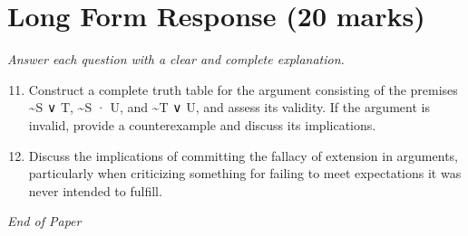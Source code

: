\documentclass[12pt]{article}
\begin{document}
\section*{Long Form Response (20 marks)}
\textit{Answer each question with a clear and complete explanation.}
\begin{enumerate}[label=\arabic*.]
\setcounter{enumi}{10}
\item Construct a complete truth table for the argument consisting of the premises \textasciitilde{}S ∨ T, \textasciitilde{}S · U, and \textasciitilde{}T ∨ U, and assess its validity. If the argument is invalid, provide a counterexample and discuss its implications.
\item Discuss the implications of committing the fallacy of extension in arguments, particularly when criticizing something for failing to meet expectations it was never intended to fulfill.
\end{enumerate}

\vfill
\noindent\textit{End of Paper}
\end{document}
